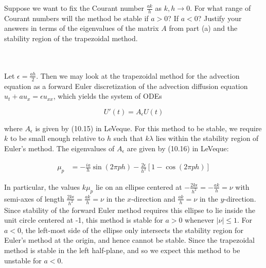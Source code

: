 Suppose we want to fix the Courant number $\frac{ak}{h}$ as $k,h \to 0$. For what range of Courant numbers will the
method be stable if $a > 0$? If $a < 0$? Justify your answers in terms of the eigenvalues of the matrix $A$ from part 
(a) and the stability region of the trapezoidal method.

\begin{solution}\ \\\\
    Let $\epsilon = \frac{ah}{2}$. Then we may look at the trapezoidal method for the advection equation as a forward
    Euler discretization of the advection diffusion equation $u_t + au_x = \epsilon u_{xx}$, which yields the system
    of ODEs

    $$
    U'(t) = A_{\epsilon}U(t)
    $$

    where $A_{\epsilon}$ is given by (10.15) in LeVeque. For this method to be stable, we require $k$ to be small
    enough relative to $h$ such that $k \lambda$ lies within the stability region of Euler's method. The eigenvalues
    of $A_{\epsilon}$ are given by (10.16) in LeVeque:

    \begin{align*}
        \mu_p &= -\frac{ia}{h}\sin{(2 \pi p h)} - \frac{2 \epsilon}{h^2}[1 - \cos{(2 \pi p h)}]
    \end{align*}

    In particular, the values $k \mu_p$ lie on an ellipse centered at $-\frac{2k \epsilon}{h^2} = -\frac{ak}{h} = \nu$
    with semi-axes of length $\frac{2k \epsilon}{h^2} = \frac{ak}{h} = \nu$ in the $x$-direction and 
    $\frac{ak}{h} = \nu$ in the $y$-direction. Since stability of the forward Euler method requires this ellipse to 
    lie inside the unit circle centered at -1, this method is stable for $a > 0$ whenever $|\nu| \le 1$. For $a < 0$, 
    the left-most side of the ellipse only intersects the stability region for Euler's method at the origin, and hence
    cannot be stable. Since the trapezoidal method is stable in the left half-plane, and so we expect this method to be
    unstable for $a < 0$.
   

    \hfill\vfill
    \ \\
\end{solution}